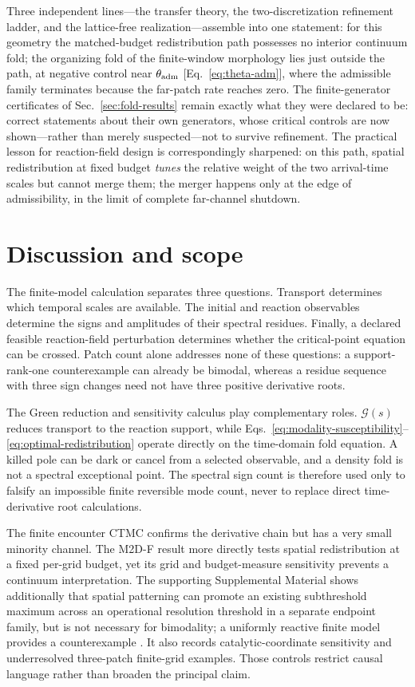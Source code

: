 \documentclass[aps,pre,reprint,amsmath,amssymb,longbibliography,floatfix]{revtex4-2}
\newcommand{\Gres}{\mathcal G}
\begin{document}
Three independent lines---the transfer theory, the two-discretization
refinement ladder, and the lattice-free realization---assemble into one
statement: for this geometry the matched-budget redistribution path
possesses no interior continuum fold; the organizing fold of the
finite-window morphology lies just outside the path, at negative control
near \(\theta_{\rm adm}\) [Eq.~\eqref{eq:theta-adm}], where the admissible
family terminates because the far-patch rate reaches zero. The finite-generator certificates of
Sec.~\ref{sec:fold-results} remain exactly what they were declared to be:
correct statements about their own generators, whose critical controls are
now shown---rather than merely suspected---not to survive refinement. The
practical lesson for reaction-field design is correspondingly sharpened:
on this path, spatial redistribution at fixed budget \emph{tunes} the
relative weight of the two arrival-time scales but cannot merge them; the
merger happens only at the edge of admissibility, in the limit of complete
far-channel shutdown.

\section{Discussion and scope}
\label{sec:discussion}

The finite-model calculation separates three questions. Transport determines
which temporal scales are available. The initial and reaction observables
determine the signs and amplitudes of their spectral residues. Finally, a
declared feasible reaction-field perturbation determines whether the
critical-point equation can be crossed. Patch count alone addresses none of
these questions: a support-rank-one counterexample can already be bimodal,
whereas a residue sequence with three sign changes need not have three
positive derivative roots.

The Green reduction and sensitivity calculus play complementary roles.
\(\Gres(s)\) reduces transport to the reaction support, while
Eqs.~\eqref{eq:modality-susceptibility}--\eqref{eq:optimal-redistribution}
operate directly on the time-domain fold equation. A killed pole can be dark
or cancel from a selected observable, and a density fold is not a spectral
exceptional point. The spectral sign count is therefore used only to
falsify an impossible finite reversible mode count, never to replace direct
time-derivative root calculations.

The finite encounter CTMC confirms the derivative chain but has a very small
minority channel. The M2D-F result more directly tests spatial redistribution
at a fixed per-grid budget, yet its grid and budget-measure sensitivity
prevents a continuum interpretation. The supporting Supplemental Material
shows additionally that spatial patterning can promote an existing
subthreshold maximum across an operational resolution threshold in a separate
endpoint family, but is not necessary for bimodality; a uniformly reactive
finite model provides a counterexample \cite{supplementalMaterial}. It also
records catalytic-coordinate sensitivity and underresolved three-patch
finite-grid examples. Those controls restrict causal language rather than
broaden the principal claim.
\end{document}
